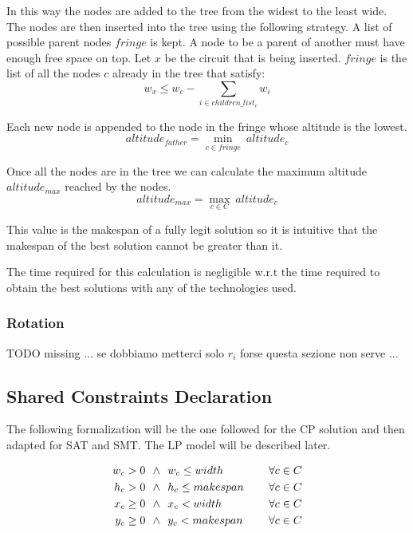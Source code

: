         In this way the nodes are added to the tree from the widest to the least wide.
        The nodes are then inserted into the tree using the following strategy. A list of possible parent nodes $fringe$ is kept. 
        A node to be a parent of another must have enough free space on top. Let $x$ be the circuit that 
        is being inserted. $fringe$ is the list of all the nodes $c$ already in the tree that satisfy: 
        \begin{equation}
            w_x \leq w_c - \sum_{i \in children\_list_c} w_i
        \end{equation}
        
        Each new node is appended to the node in the fringe whose altitude is the lowest.
        \begin{equation}
            altitude_{father} = \min_{c \in fringe}\ {altitude_c} 
        \end{equation}

        Once all the nodes are in the tree we can calculate the maximum altitude $altitude_{max}$ reached by the nodes.
        \begin{equation}
            altitude_{max} = \max_{c \in C}\  altitude_c
        \end{equation}

        This value is the makespan of a fully legit solution so it is intuitive that the makespan of the best solution cannot
        be greater than it. 
        
        The time required for this calculation is negligible w.r.t the time required to obtain the best solutions with any 
        of the technologies used.

    \subsubsection{Rotation}
        \colorbox{BurntOrange}{TODO missing ... se dobbiamo metterci solo $r_i$ forse questa sezione non serve ...}



\subsection{Shared Constraints Declaration}
    The following formalization will be the one followed for the CP solution and then adapted for SAT and SMT. 
    The LP model will be described later.

    \begin{align*}
           w_c > 0\ \ \land\ &\ w_c \leq width\    &\ \hspace{0.2cm} \forall c \in C \\
           h_c > 0\ \ \land\ &\ h_c \leq makespan\ &\ \hspace{0.2cm} \forall c \in C \\
        x_c \geq 0\ \ \land\ &\ x_c < width\    &\ \hspace{0.2cm} \forall c \in C \\
        y_c \geq 0\ \ \land\ &\ y_c < makespan\ &\ \hspace{0.2cm} \forall c \in C
    \end{align*}

